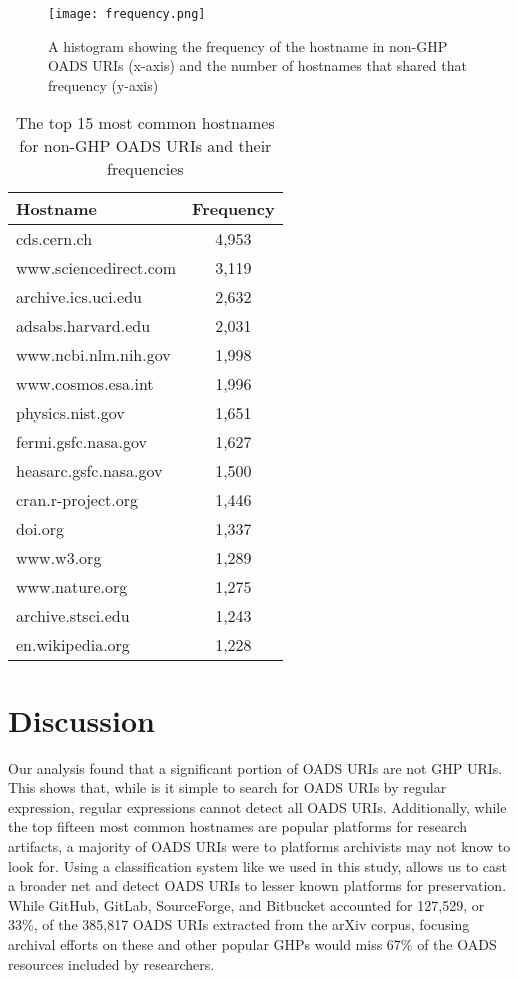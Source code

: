 \begin{figure}
    \centering
    \texttt{[image: frequency.png]}
    \caption{A histogram showing the frequency of the hostname in non-GHP OADS URIs (x-axis) and the number of hostnames that shared that frequency (y-axis)}
    \label{fig:frequency}
\end{figure}

\begin{table}
    \centering
    \begin{tabular}{|l|c|}
    \hline
    Hostname & Frequency \\
    \hline
    cds.cern.ch & 4,953 \\
    www.sciencedirect.com & 3,119 \\
    archive.ics.uci.edu & 2,632 \\
    adsabs.harvard.edu & 2,031 \\
    www.ncbi.nlm.nih.gov & 1,998 \\
    www.cosmos.esa.int & 1,996 \\
    physics.nist.gov & 1,651 \\
    fermi.gsfc.nasa.gov & 1,627 \\
    heasarc.gsfc.nasa.gov & 1,500 \\
    cran.r-project.org & 1,446 \\
    doi.org & 1,337 \\
    www.w3.org & 1,289 \\
    www.nature.org & 1,275 \\
    archive.stsci.edu & 1,243 \\
    en.wikipedia.org & 1,228 \\
    \hline
    \end{tabular}
    \caption{The top 15 most common hostnames for non-GHP OADS URIs and their frequencies}
    \label{tab:hostnames}
\end{table}

\section{Discussion}

Our analysis found that a significant portion of OADS URIs are not GHP URIs. This shows that, while is it simple to search for OADS URIs by regular expression, regular expressions cannot detect all OADS URIs. Additionally, while the top fifteen most common hostnames are popular platforms for research artifacts, a majority of OADS URIs were to platforms archivists may not know to look for. Using a classification system like we used in this study, allows us to cast a broader net and detect OADS URIs to lesser known platforms for preservation. While GitHub, GitLab, SourceForge, and Bitbucket accounted for 127,529, or 33\%, of the 385,817 OADS URIs extracted from the arXiv corpus, focusing archival efforts on these and other popular GHPs would miss 67\% of the OADS resources included by researchers. 

